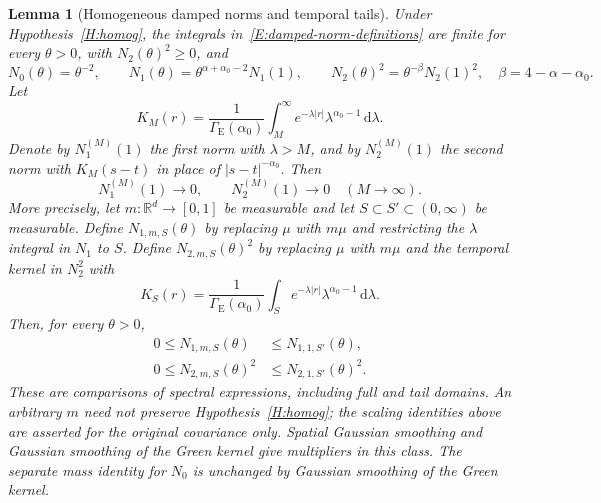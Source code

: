 \documentclass[12pt,oneside,openany]{book}
\makeatletter
\let\lean@pending\@empty
\newcommand{\LeanMarker}[1]{\gdef\lean@pending{#1}}
\numberwithin{equation}{section}
\newtheorem{lemma}[theorem]{Lemma}
\theoremstyle{nogostyle}
\theoremstyle{definition}
\newcommand{\R}{\mathbb{R}}
\newcommand{\ud}{\,\mathrm{d}}
\makeatother
\begin{document}
\LeanMarker{L:damped-homogeneous-norms}
\begin{lemma}[Homogeneous damped norms and temporal tails]
  \label{L:damped-homogeneous-norms}
  Under Hypothesis~\ref{H:homog}, the integrals
  in~\eqref{E:damped-norm-definitions} are finite for every $\theta > 0$, with
  $N_2(\theta)^2 \ge 0$, and
  \[
    N_0(\theta)=\theta^{-2},\qquad
    N_1(\theta)=\theta^{\alpha+\alpha_0-2}N_1(1),\qquad
    N_2(\theta)^2=\theta^{-\beta}N_2(1)^2,
    \quad\beta=4-\alpha-\alpha_0.
  \]
  Let
  \[
    K_M(r)=\frac1{\Gamma_{\mathrm{E}}(\alpha_0)}
    \int_M^\infty e^{-\lambda|r|}\lambda^{\alpha_0-1}\ud\lambda.
  \]
  Denote by $N_1^{(M)}(1)$ the first norm with $\lambda > M$, and by
  $N_2^{(M)}(1)$ the second norm with $K_M(s-t)$ in place of
  $|s-t|^{-\alpha_0}$. Then
  \begin{equation}\label{E:damped-tail-norms}
    N_1^{(M)}(1)\longrightarrow0,\qquad
    N_2^{(M)}(1)\longrightarrow0\quad(M\to\infty).
  \end{equation}
  More precisely, let $m:\R^d\to[0,1]$ be measurable and let
  $S\subset S'\subset(0,\infty)$ be measurable. Define $N_{1,m,S}(\theta)$
  by replacing $\mu$ with $m\mu$ and restricting the $\lambda$ integral in
  $N_1$ to $S$. Define $N_{2,m,S}(\theta)^2$ by replacing $\mu$ with $m\mu$
  and the temporal kernel in $N_2^2$ with
  \[
    K_S(r)=\frac1{\Gamma_{\mathrm{E}}(\alpha_0)}
    \int_S e^{-\lambda|r|}\lambda^{\alpha_0-1}\ud\lambda.
  \]
  Then, for every $\theta>0$,
  \begin{equation}\label{E:damped-multiplier-comparison}
    \begin{split}
      0\le N_{1,m,S}(\theta)&\le N_{1,1,S'}(\theta),\\
      0\le N_{2,m,S}(\theta)^2&\le N_{2,1,S'}(\theta)^2.
    \end{split}
  \end{equation}
  These are comparisons of spectral expressions, including full and tail
  domains. An arbitrary $m$ need not preserve Hypothesis~\ref{H:homog}; the
  scaling identities above are asserted for the original covariance only.
  Spatial Gaussian smoothing and Gaussian smoothing of the Green kernel
  give multipliers in this class. The separate mass identity for $N_0$ is
  unchanged by Gaussian smoothing of the Green kernel.
\end{lemma}
\end{document}

